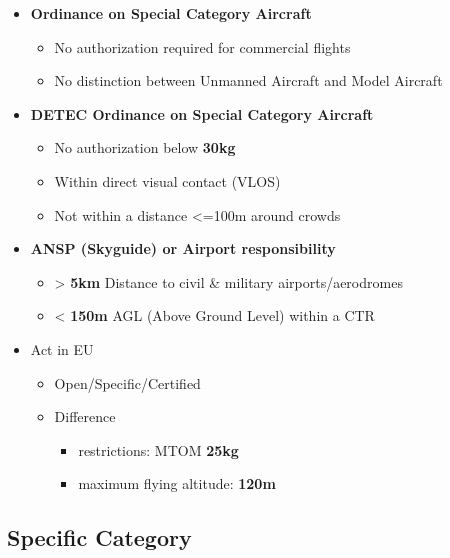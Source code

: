 \documentclass[]{article}
\begin{document}
\begin{itemize}
\item
  \textbf{Ordinance on Special Category Aircraft}

  \begin{itemize}
  \item
    No authorization required for commercial flights
  \item
    No distinction between Unmanned Aircraft and Model Aircraft
  \end{itemize}
\item
  \textbf{DETEC Ordinance on Special Category Aircraft}

  \begin{itemize}
  \item
    No authorization below \textbf{30kg}
  \item
    Within direct visual contact (VLOS)
  \item
    Not within a distance \textless{}=100m around crowds
  \end{itemize}
\item
  \textbf{ANSP (Skyguide) or Airport responsibility}

  \begin{itemize}
  \item
    \textgreater{} \textbf{5km} Distance to civil \& military
    airports/aerodromes
  \item
    \textless{} \textbf{150m} AGL (Above Ground Level) within a CTR
  \end{itemize}
\item
  Act in EU

  \begin{itemize}
  \item
    Open/Specific/Certified
  \item
    Difference

    \begin{itemize}
    \item
      restrictions: MTOM \textbf{25kg}
    \item
      maximum flying altitude: \textbf{120m} 
    \end{itemize}
  \end{itemize}
\end{itemize}

\subsection{Specific Category}\label{header-n1774}
\end{document}
